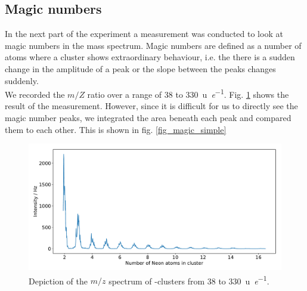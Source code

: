\documentclass[a4paper,10pt]{article}
\begin{document}
\subsection{Magic numbers}
In the next part of the experiment a measurement was conducted to look at magic numbers in the mass spectrum. Magic numbers are defined as a number of atoms where a cluster shows extraordinary behaviour, i.e. the there is a sudden change in the amplitude of a peak or the slope between the peaks changes suddenly. \\
We recorded the $m/Z$ ratio over a range of \SI{38}{} to \SI{330}{\atomicmassunit \per \elementarycharge}. Fig. \ref{fig_magic_peak} shows the result of the measurement. However, since it is difficult for us to directly see the magic number peaks, we integrated the area beneath each peak and compared them to each other. This is shown in fig. \ref{fig_magic_simple}

\begin{figure}[H]
	\centering
	\includegraphics[width = 0.8 \textwidth]{magic_peaks.pdf}
	\caption{Depiction of the $m/z$ spectrum of -clusters from \SI{38}{} to \SI{330}{\atomicmassunit \per \elementarycharge}.}
	\label{fig_magic_peak}
\end{figure}
\end{document}
